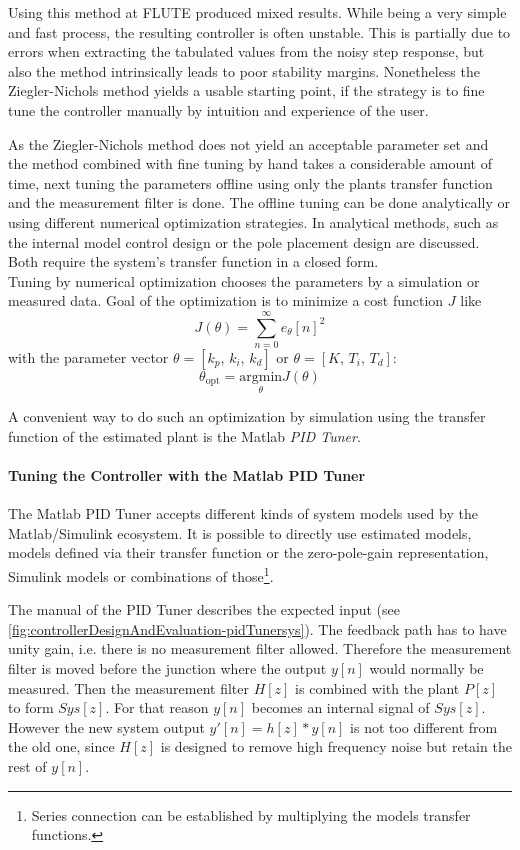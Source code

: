 Using this method at FLUTE produced mixed results. While being a very simple and fast process, the resulting controller is often unstable. This is partially due to errors when extracting the tabulated values from the noisy step response, but also the method intrinsically leads to poor stability margins.\cite[p.~142]{Aastroem1995}
Nonetheless the Ziegler-Nichols method yields a usable starting point, if the strategy is to fine tune the controller manually by intuition and experience of the user.

As the Ziegler-Nichols method does not yield an acceptable parameter set and the method combined with fine tuning by hand takes a considerable amount of time, next tuning the parameters offline using only the plants transfer function and the measurement filter is done.
The offline tuning can be done analytically or using different numerical optimization strategies. In \cite{DiazRodriguez2019} analytical methods, such as the internal model control design or the pole placement design are discussed. Both require the system's transfer function in a closed form.\\
Tuning by numerical optimization chooses the parameters by a simulation or measured data. Goal of the optimization is to minimize a cost function $J$ like
\begin{equation}
J(\theta) = \sum_{n=0}^{\infty} e_{\theta}[n]^2
\end{equation}
with the parameter vector $\theta=[k_p,\,k_i,\,k_d]$ or $\theta=[K,\,T_i,\,T_d]$:
\begin{equation}
\theta_\text{opt} = \underset{\theta}{\text{argmin}} J(\theta)
\end{equation}

A convenient way to do such an optimization by simulation using the transfer function of the estimated plant is the Matlab \textit{PID Tuner}.

\paragraph{Tuning the Controller with the Matlab PID Tuner}
The Matlab PID Tuner accepts different kinds of system models used by the Matlab/Simulink ecosystem. It is possible to directly use estimated models, models defined via their transfer function or the zero-pole-gain representation, Simulink models or combinations of those\footnote{Series connection can be established by multiplying the models transfer functions.}.

The manual of the PID Tuner\cite{pidTunerMan} describes the expected input (see \autoref{fig:controllerDesignAndEvaluation-pidTunersys}). The feedback path has to have unity gain, i.e. there is no measurement filter allowed. Therefore the measurement filter is moved before the junction where the output $y[n]$ would normally be measured. Then the measurement filter $H[z]$ is combined with the plant $P[z]$ to form $Sys[z]$. For that reason $y[n]$ becomes an internal signal of $Sys[z]$. However the new system output $y'[n]=h[z] \ast y[n]$ is not too different from the old one, since $H[z]$ is designed to remove high frequency noise but retain the rest of $y[n]$.

